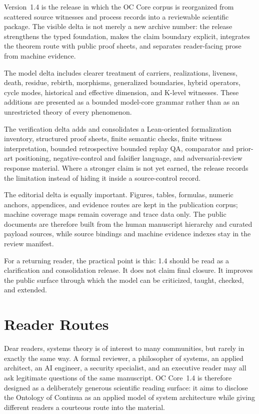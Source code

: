 Version~1.4 is the release in which the OC Core corpus is reorganized from
scattered source witnesses and process records into a reviewable scientific
package. The visible delta is not merely a new archive number: the release
strengthens the typed foundation, makes the claim boundary explicit, integrates
the theorem route with public proof sheets, and separates reader-facing prose
from machine evidence.

The model delta includes clearer treatment of carriers, realizations, liveness,
death, residue, rebirth, morphisms, generalized boundaries, hybrid operators,
cycle modes, historical and effective dimension, and K-level witnesses. These
additions are presented as a bounded model-core grammar rather than as an
unrestricted theory of every phenomenon.

The verification delta adds and consolidates a Lean-oriented formalization inventory, structured
proof sheets, finite semantic checks, finite witness interpretation, bounded
retrospective bounded replay QA, comparator and prior-art positioning, negative-control
and falsifier language, and adversarial-review response material. Where a
stronger claim is not yet earned, the release records the limitation instead of
hiding it inside a source-control record.

The editorial delta is equally important. Figures, tables, formulas, numeric
anchors, appendices, and evidence routes are kept in the publication corpus;
machine coverage maps remain coverage and trace data only. The public
documents are therefore built from the human manuscript hierarchy and curated
payload sources, while source bindings and machine evidence indexes stay in the
review manifest.

For a returning reader, the practical point is this: 1.4 should be read as a
clarification and consolidation release. It does not claim final closure. It
improves the public surface through which the model can be criticized, taught,
checked, and extended.

\clearpage
\section*{Reader Routes}
{}
Dear readers, systems theory is of interest to many communities, but rarely in
exactly the same way. A formal reviewer, a philosopher of systems, an applied
architect, an AI engineer, a security specialist, and an executive reader may
all ask legitimate questions of the same manuscript. OC Core~1.4 is therefore
designed as a deliberately generous scientific reading surface: it aims to
disclose the Ontology of Continua as an applied model of system architecture
while giving different readers a courteous route into the material.

